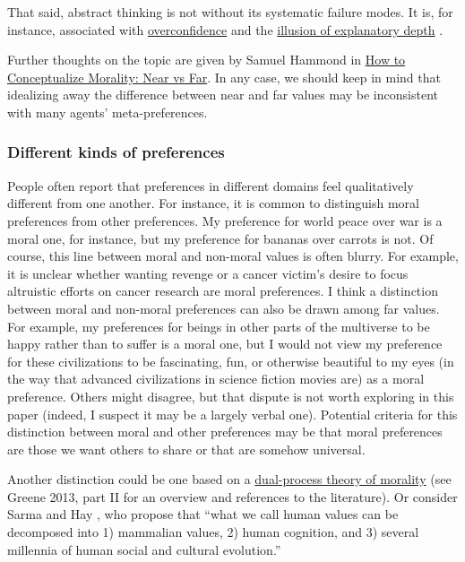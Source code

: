 That said, abstract thinking is not without its systematic failure
modes. It is, for instance, associated with
\href{https://en.wikipedia.org/wiki/Overconfidence_effect}{overconfidence}
and the \href{https://www.edge.org/response-detail/27117}{illusion
of explanatory depth} \parencite{Alter2010-lu}.

Further thoughts on the topic are given by Samuel Hammond in
\href{http://abstractminutiae.com/post/85550239565/how-to-conceptualize-morality-near-vs-far}{How
to Conceptualize Morality: Near vs Far}. In any case, we should keep
in mind that idealizing away the difference between near and far values
may be inconsistent with many agents' meta-preferences.

\subsubsection{Different kinds of
preferences}\label{different-kinds-of-preferences}

People often report that preferences in different domains feel
qualitatively different from one another. For instance, it is common to
distinguish moral preferences from other preferences. My preference for
world peace over war is a moral one, for instance, but my preference for
bananas over carrots is not. Of course, this line between moral and non-moral
values is often blurry. For example, it is unclear whether wanting
revenge or a cancer victim's desire to focus altruistic efforts on
cancer research are moral preferences. I think a distinction between moral and non-moral preferences can also be
drawn among far values. For example, my preferences for beings in
other parts of the multiverse to be happy rather than to suffer is a
moral one, but I would not view my preference for these civilizations to
be fascinating, fun, or otherwise beautiful to my eyes (in the way that
advanced civilizations in science fiction movies are) as a moral
preference. Others might disagree, but that dispute is not worth
exploring in this paper (indeed, I suspect it may be a largely verbal
one). Potential criteria for this distinction between moral and other
preferences may be that moral preferences are those we want others to
share or that are somehow universal.

Another distinction could be one based on a
\href{https://en.wikipedia.org/wiki/Dual_process_theory_(moral_psychology)}{dual-process
theory of morality} (see Greene 2013, part II for an overview and
references to the literature). Or consider Sarma and Hay \citeyear{noauthor_undated-wg}, who propose
that ``what we call human values can be decomposed into 1) mammalian values, 2) human cognition, and
3) several millennia of human social and cultural evolution.''

